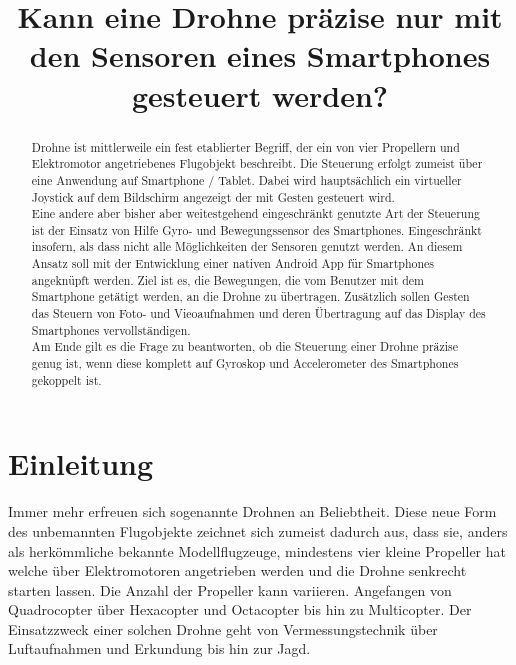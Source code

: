 \documentclass{article}
\title{Kann eine Drohne präzise nur mit den Sensoren eines Smartphones gesteuert werden?}
\begin{document}
\maketitle
\begin{abstract}
Drohne ist mittlerweile ein fest etablierter Begriff, der ein von vier Propellern und Elektromotor angetriebenes Flugobjekt beschreibt. Die Steuerung erfolgt zumeist über eine Anwendung auf Smartphone / Tablet. Dabei wird hauptsächlich ein virtueller Joystick auf dem Bildschirm angezeigt der mit Gesten gesteuert wird.\\ Eine andere aber bisher aber weitestgehend eingeschränkt genutzte Art der Steuerung ist der Einsatz von Hilfe Gyro- und Bewegungssensor des Smartphones. Eingeschränkt insofern, als dass nicht alle Möglichkeiten der Sensoren genutzt werden. An diesem Ansatz soll mit der Entwicklung einer nativen Android App für Smartphones angeknüpft werden. Ziel ist es, die Bewegungen, die vom Benutzer mit dem Smartphone getätigt werden, an die Drohne zu übertragen. Zusätzlich sollen Gesten das Steuern von Foto- und Vieoaufnahmen und deren Übertragung auf das Display des Smartphones vervollständigen.\\ Am Ende gilt es die Frage zu beantworten, ob die Steuerung einer Drohne präzise genug ist, wenn diese komplett auf Gyroskop und Accelerometer des Smartphones gekoppelt ist.

\end{abstract}

\section{Einleitung}
\label{sec:einleitung}
Immer mehr erfreuen sich sogenannte Drohnen an Beliebtheit. Diese neue Form des unbemannten Flugobjekte zeichnet sich zumeist dadurch aus, dass sie, anders als herkömmliche bekannte Modellflugzeuge, mindestens vier kleine Propeller hat welche über Elektromotoren angetrieben werden und die Drohne senkrecht starten lassen. Die Anzahl der Propeller kann variieren. Angefangen von Quadrocopter über Hexacopter und Octacopter bis hin zu Multicopter. Der Einsatzzweck einer solchen Drohne geht von Vermessungstechnik über Luftaufnahmen und Erkundung bis hin zur Jagd.
\end{document}
